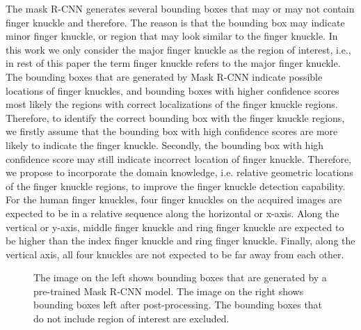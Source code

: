 The mask R-CNN generates several bounding boxes that may or may not contain finger knuckle and therefore. The reason is that the bounding box may indicate minor finger knuckle, or region that may look similar to the finger knuckle. In this work we only consider the major finger knuckle as the region of interest, i.e., in rest of this paper the term finger knuckle refers to the major finger knuckle. The bounding boxes that are generated by Mask R-CNN indicate possible locations of finger knuckles, and bounding boxes with higher confidence scores most likely the regions with correct localizations of the finger knuckle regions. Therefore, to identify the correct bounding box with the finger knuckle regions, we firstly assume that the bounding box with high confidence scores are more likely to indicate the finger knuckle. Secondly, the bounding box with high confidence score may still indicate incorrect location of finger knuckle. Therefore, we propose to incorporate the domain knowledge, i.e. relative geometric locations of the finger knuckle regions, to improve the finger knuckle detection capability. For the human finger knuckles, four finger knuckles on the acquired images are expected to be in a relative sequence along the horizontal or x-axis. Along the vertical or y-axis, middle finger knuckle and ring finger knuckle are expected to be higher than the index finger knuckle and ring finger knuckle. Finally, along the vertical axis, all four knuckles are not expected to be far away from each other.

\begin{figure}[ht!]
    \centering

    \caption{The image on the left shows bounding boxes that are generated by a pre-trained Mask R-CNN model. The image on the right shows bounding boxes left after post-processing. The bounding boxes that do not include region of interest are excluded.}
    \label{select-finger-knuckle}
\end{figure}

